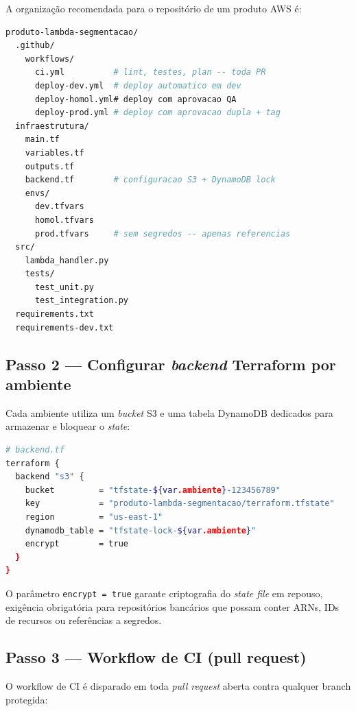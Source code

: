 A organiza\c{c}\~ao recomendada para o reposit\'orio de um produto AWS \'e:

\begin{lstlisting}[language=bash,
  caption={Estrutura de reposit\'orio de produto AWS banc\'ario.},
  label={lst:repo_estrutura}]
produto-lambda-segmentacao/
  .github/
    workflows/
      ci.yml          # lint, testes, plan -- toda PR
      deploy-dev.yml  # deploy automatico em dev
      deploy-homol.yml# deploy com aprovacao QA
      deploy-prod.yml # deploy com aprovacao dupla + tag
  infraestrutura/
    main.tf
    variables.tf
    outputs.tf
    backend.tf        # configuracao S3 + DynamoDB lock
    envs/
      dev.tfvars
      homol.tfvars
      prod.tfvars     # sem segredos -- apenas referencias
  src/
    lambda_handler.py
    tests/
      test_unit.py
      test_integration.py
  requirements.txt
  requirements-dev.txt
\end{lstlisting}

\subsection{Passo 2 --- Configurar \textit{backend} Terraform por ambiente}

Cada ambiente utiliza um \textit{bucket} S3 e uma tabela
DynamoDB dedicados para armazenar e bloquear o \textit{state}:

\begin{lstlisting}[language=bash,
  caption={Backend Terraform com lock por conta AWS.},
  label={lst:terraform_backend}]
# backend.tf
terraform {
  backend "s3" {
    bucket         = "tfstate-${var.ambiente}-123456789"
    key            = "produto-lambda-segmentacao/terraform.tfstate"
    region         = "us-east-1"
    dynamodb_table = "tfstate-lock-${var.ambiente}"
    encrypt        = true
  }
}
\end{lstlisting}

O par\^ametro \texttt{encrypt = true} garante criptografia do
\textit{state file} em repouso,
exig\^encia obrigat\'oria para reposit\'orios banc\'arios que possam
conter ARNs, IDs de recursos ou refer\^encias a segredos.

\subsection{Passo 3 --- Workflow de CI (pull request)}

O workflow de CI \'e disparado em toda \textit{pull request} aberta
contra qualquer branch protegida:

